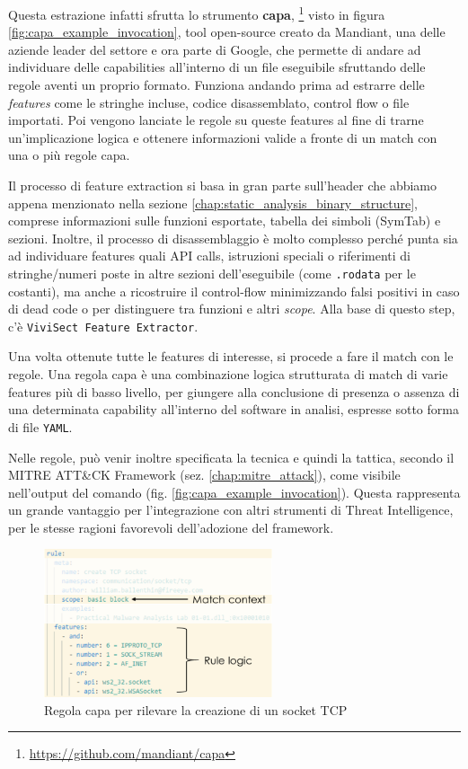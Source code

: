 Questa estrazione infatti sfrutta lo strumento \textbf{capa},
\footnote{\url{https://github.com/mandiant/capa}}
visto in figura \ref{fig:capa_example_invocation},
tool open-source creato da Mandiant, una delle aziende leader del settore e ora parte di Google,
che permette di andare ad individuare delle capabilities all'interno di un file eseguibile
sfruttando delle regole aventi un proprio formato.
Funziona andando prima ad estrarre delle \emph{features} come le stringhe incluse, codice disassemblato, control flow o file importati.
Poi vengono lanciate le regole su queste features al fine di trarne un'implicazione logica e ottenere informazioni valide a fronte di un match con una o più regole capa.

Il processo di feature extraction si basa in gran parte sull'header che abbiamo appena menzionato nella sezione \ref{chap:static_analysis_binary_structure}, comprese informazioni sulle funzioni esportate, tabella dei simboli (SymTab) e sezioni. Inoltre, il processo di disassemblaggio è molto complesso perché punta sia ad individuare features quali API calls, istruzioni speciali o riferimenti di stringhe/numeri poste in altre sezioni dell'eseguibile (come \texttt{.rodata} per le costanti), ma anche a ricostruire il control-flow minimizzando falsi positivi in caso di dead code o per distinguere tra funzioni e altri \emph{scope}. Alla base di questo step, c'è \texttt{ViviSect Feature Extractor}. \cite{capa_mandiant_blogpost}

Una volta ottenute tutte le features di interesse, si procede a fare il match con le regole.
Una regola capa è una combinazione logica strutturata di match di varie features più di basso livello, per giungere alla conclusione di presenza o assenza di una determinata capability all'interno del software in analisi, espresse sotto forma di file \texttt{YAML}.

Nelle regole, può venir inoltre specificata la tecnica e quindi la tattica, secondo il MITRE ATT\&CK Framework (sez. \ref{chap:mitre_attack}), come visibile nell'output del comando (fig. \ref{fig:capa_example_invocation}).
Questa rappresenta un grande vantaggio per l'integrazione con altri strumenti di Threat Intelligence, per le stesse ragioni favorevoli dell'adozione del framework.

\begin{figure}[!htb]
    \centering
    \includegraphics[width=0.6\textwidth]{assets/capa_example_rule.png}
    \caption{Regola capa per rilevare la creazione di un socket TCP}
    \label{fig:enter-label}
\end{figure}

